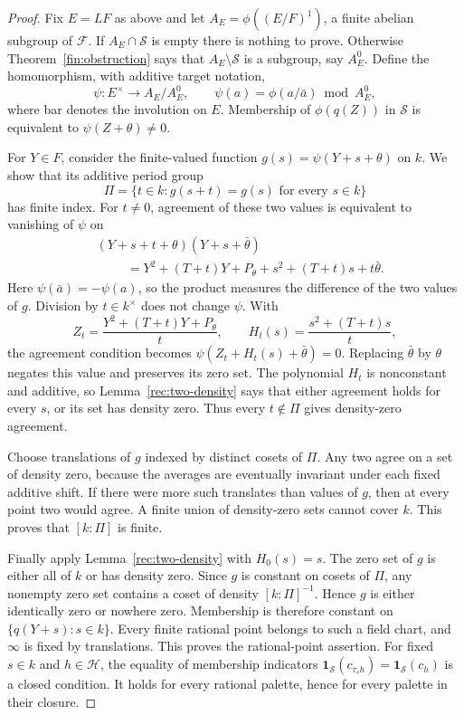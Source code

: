 \begin{proof}
Fix \(E=LF\) as above and let
\(A_E=\phi((E/F)^1)\), a finite abelian subgroup of \(\mathcal F\).
If \(A_E\cap\mathcal S\) is empty there is nothing to prove.  Otherwise
Theorem~\ref{fin:obstruction} says that
\(A_E\setminus\mathcal S\) is a subgroup, say \(A_E^0\).  Define the
homomorphism, with additive target notation,
\[
 \psi:E^\times\longrightarrow A_E/A_E^0,
 \qquad \psi(a)=\phi(a/\bar a)\bmod A_E^0,
\]
where bar denotes the involution on \(E\).  Membership of
\(\phi(q(Z))\) in \(\mathcal S\) is equivalent to
\(\psi(Z+\theta)\ne0\).

For \(Y\in F\), consider the finite-valued function
\(g(s)=\psi(Y+s+\theta)\) on \(k\).  We show that its additive period
group
\[
 \Pi=\{t\in k:g(s+t)=g(s)\text{ for every }s\in k\}
\]
has finite index.  For \(t\ne0\), agreement of these two values is
equivalent to vanishing of \(\psi\) on
\begin{align*}
 &(Y+s+t+\theta)(Y+s+\bar\theta)\\
 &\hspace{1cm}=Y^2+(T+t)Y+P_\theta+s^2+(T+t)s+t\bar\theta.
\end{align*}
Here \(\psi(\bar a)=-\psi(a)\), so the product measures the difference
of the two values of \(g\).  Division by \(t\in k^\times\) does not
change \(\psi\).  With
\[
 Z_t=\frac{Y^2+(T+t)Y+P_\theta}{t},\qquad
 H_t(s)=\frac{s^2+(T+t)s}{t},
\]
the agreement condition becomes
\(\psi(Z_t+H_t(s)+\bar\theta)=0\).  Replacing \(\bar\theta\) by
\(\theta\) negates this value and preserves its zero set.  The
polynomial \(H_t\) is nonconstant and additive, so
Lemma~\ref{rec:two-density} says that either agreement holds for every
\(s\), or its set has density zero.  Thus every \(t\notin\Pi\)
gives density-zero agreement.

Choose translations of \(g\) indexed by distinct cosets of \(\Pi\).
Any two agree on a set of density zero, because the averages are
eventually invariant under each fixed additive shift.  If there were
more such translates than values of \(g\), then at every point two
would agree.  A finite union of density-zero sets cannot cover \(k\).
This proves that \([k:\Pi]\) is finite.

Finally apply Lemma~\ref{rec:two-density} with \(H_0(s)=s\).  The zero
set of \(g\) is either all of \(k\) or has density zero.  Since \(g\)
is constant on cosets of \(\Pi\), any nonempty zero set contains a
coset of density \([k:\Pi]^{-1}\).  Hence \(g\) is either identically
zero or nowhere zero.  Membership is therefore constant on
\(\{q(Y+s):s\in k\}\).  Every finite rational point belongs to such
a field chart, and \(\infty\) is fixed by translations.  This proves
the rational-point assertion.  For fixed \(s\in k\) and
\(h\in\mathcal H\), the equality of membership indicators
\(\boldsymbol1_{\mathcal S}(c_{\tau_s h})=
\boldsymbol1_{\mathcal S}(c_h)\) is a closed condition.  It holds for
every rational palette, hence for every palette in their closure.
\end{proof}

